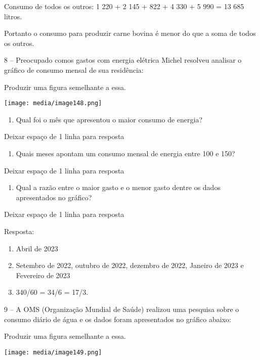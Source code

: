 Consumo de todos os outros: 1 220 + 2 145 + 822 + 4 330 + 5 990 = 13 685
litros.

Portanto o consumo para produzir carne bovina é menor do que a soma de
todos os outros.

8 -- Preocupado comos gastos com energia elétrica Michel resolveu
analisar o gráfico de consumo mensal de sua residência:

Produzir uma figura semelhante a essa.

\texttt{[image: media/image148.png]}

\begin{enumerate}
\def\labelenumi{\alph{enumi})}
\item
  Qual foi o mês que apresentou o maior consumo de energia?
\end{enumerate}

Deixar espaço de 1 linha para resposta

\begin{enumerate}
\def\labelenumi{\alph{enumi})}
\item
  Quais meses apontam um consumo mensal de energia entre 100 e 150?
\end{enumerate}

Deixar espaço de 1 linha para resposta

\begin{enumerate}
\def\labelenumi{\alph{enumi})}
\item
  Qual a razão entre o maior gasto e o menor gasto dentre os dados
  apresentados no gráfico?
\end{enumerate}

Deixar espaço de 1 linha para resposta

Resposta:

\begin{enumerate}
\def\labelenumi{\alph{enumi})}
\item
  Abril de 2023
\item
  Setembro de 2022, outubro de 2022, dezembro de 2022, Janeiro de 2023 e
  Fevereiro de 2023
\item
  340/60 = 34/6 = 17/3.
\end{enumerate}

9 -- A OMS (Organização Mundial de Saúde) realizou uma pesquisa sobre o
consumo diário de água e os dados foram apresentados no gráfico abaixo:

Produzir uma figura semelhante a essa.

\texttt{[image: media/image149.png]}

